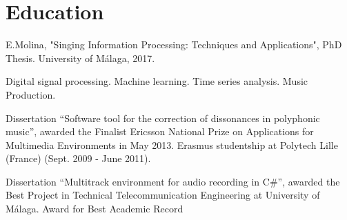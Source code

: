 \documentclass[]{deedy-resume-openfont}
\begin{document}
\begin{minipage}[t]{0.66\textwidth}



\section{Education}
\begin{tightemize}
\item E.Molina, "Singing Information Processing: Techniques and Applications", PhD Thesis. University of Málaga, 2017.
\end{tightemize}
\begin{tightemize}
\item Digital signal processing. Machine learning. Time series analysis. Music Production.
\end{tightemize}
\begin{tightemize}
\item Dissertation
``Software tool for the correction of dissonances in polyphonic music'', awarded
the Finalist Ericsson National Prize on Applications for Multimedia Environments in May 2013. Erasmus studentship at Polytech Lille (France) (Sept. 2009 - June 2011).
\end{tightemize}
\begin{tightemize}
\item Dissertation
``Multitrack environment for audio recording in C\#'', awarded the Best Project in Technical Telecommunication Engineering at University of Málaga. Award for Best Academic Record
\end{tightemize}

\sectionsep

\sectionsep


\end{minipage} 
\end{document}

